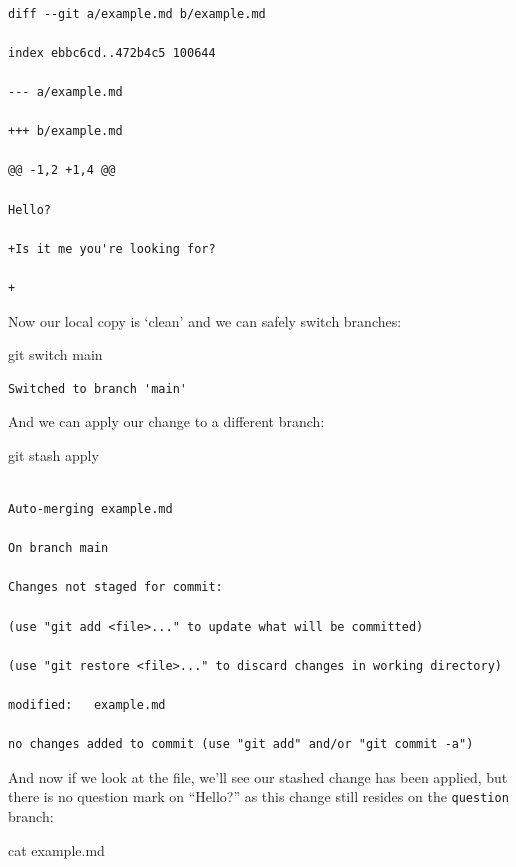 \documentclass[
  letterpaper,
  DIV=11,
  numbers=noendperiod]{scrartcl}
\newenvironment{Shaded}{\begin{snugshade}}{\end{snugshade}}
\newcommand{\FunctionTok}[1]{\textcolor[rgb]{0.28,0.35,0.67}{#1}}
\newcommand{\NormalTok}[1]{\textcolor[rgb]{0.00,0.23,0.31}{#1}}
\begin{document}
\begin{verbatim}

diff --git a/example.md b/example.md

index ebbc6cd..472b4c5 100644

--- a/example.md

+++ b/example.md

@@ -1,2 +1,4 @@

Hello?

+Is it me you're looking for?

+
\end{verbatim}

Now our local copy is `clean' and we can safely switch branches:

\begin{Shaded}
\begin{Highlighting}[]
\FunctionTok{git}\NormalTok{ switch main}
\end{Highlighting}
\end{Shaded}

\begin{verbatim}
Switched to branch 'main'
\end{verbatim}

And we can apply our change to a different branch:

\begin{Shaded}
\begin{Highlighting}[]
\FunctionTok{git}\NormalTok{ stash apply}
\end{Highlighting}
\end{Shaded}

\begin{verbatim}

Auto-merging example.md

On branch main

Changes not staged for commit:

(use "git add <file>..." to update what will be committed)

(use "git restore <file>..." to discard changes in working directory)

modified:   example.md

no changes added to commit (use "git add" and/or "git commit -a")
\end{verbatim}

And now if we look at the file, we'll see our stashed change has been
applied, but there is no question mark on ``Hello?'' as this change
still resides on the \texttt{question} branch:

\begin{Shaded}
\begin{Highlighting}[]
\FunctionTok{cat}\NormalTok{ example.md}
\end{Highlighting}
\end{Shaded}
\end{document}
